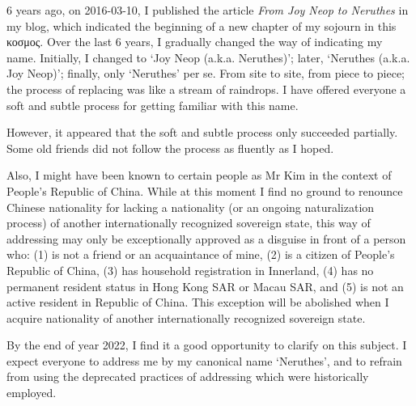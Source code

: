 
\begin{multicols*}{2}
	6 years ago, on 2016-03-10, I published the article \textit{From Joy Neop to Neruthes} in my blog,
	which indicated the beginning of a new chapter of my sojourn in this κοσμος.
	Over the last 6 years, I gradually changed the way of indicating my name.
	Initially, I changed to `Joy Neop (a.k.a. Neruthes)'; later, `Neruthes (a.k.a. Joy Neop)';
	finally, only `Neruthes' per se.
	From site to site, from piece to piece;
	the process of replacing was like a stream of raindrops.
	I have offered everyone a soft and subtle process for getting familiar with this name.

	However, it appeared that the soft and subtle process only succeeded partially.
	Some old friends did not follow the process as fluently as I hoped.

	Also, I might have been known to certain people as Mr Kim in the context of People's Republic of China.
	While at this moment I find no ground to renounce Chinese nationality for lacking a nationality (or an ongoing naturalization process)
	of another internationally recognized sovereign state,
	this way of addressing may only be exceptionally approved as a disguise in front of a person who:
	(1) is not a friend or an acquaintance of mine,
	(2) is a citizen of People's Republic of China,
	(3) has household registration in Innerland,
	(4) has no permanent resident status in Hong Kong SAR or Macau SAR, and
	(5) is not an active resident in Republic of China.
	This exception will be abolished when I acquire nationality of another internationally recognized sovereign state.

	By the end of year 2022, I find it a good opportunity to clarify on this subject.
	I expect everyone to address me by my canonical name `Neruthes',
	and to refrain from using the deprecated practices of addressing which were historically employed.
\end{multicols*}

